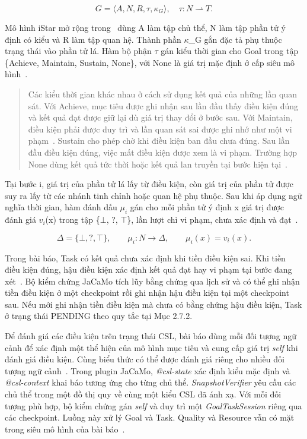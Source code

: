 \documentclass[12pt,a4paper,oneside]{extreport}
\newcommand{\thesisdisplaytitle}[2]{%
  \par\smallskip\noindent\makebox[\linewidth][c]{\small\textbf{#1}\ #2}\par\nobreak}
\begin{document}
\begin{samepage}

\thesisdisplaytitle{Định nghĩa 2.2}{Mô hình iStar mở rộng}

\[G = \langle A,N,R,\tau,\kappa_{G}\rangle,\quad\tau:N \rightharpoonup T.\]

\end{samepage}

Mô hình iStar mở rộng trong~\cite{ref-28} dùng A làm tập chủ thể, N làm tập phần tử ý định có kiểu và R làm tập quan hệ. Thành phần \(\kappa\)\_G gắn đặc tả phụ thuộc trạng thái vào phần tử lá. Hàm bộ phận \(\tau\) gán kiểu thời gian cho Goal trong tập \{Achieve, Maintain, Sustain, None\}, với None là giá trị mặc định ở cấp siêu mô hình~\cite{ref-28}.

\begin{quote}
Các kiểu thời gian khác nhau ở cách sử dụng kết quả của những lần quan sát. Với Achieve, mục tiêu được ghi nhận sau lần đầu thấy điều kiện đúng và kết quả đạt được giữ lại dù giá trị thay đổi ở bước sau. Với Maintain, điều kiện phải được duy trì và lần quan sát sai được ghi nhớ như một vi phạm~\cite{ref-28}. Sustain cho phép chờ khi điều kiện ban đầu chưa đúng. Sau lần đầu điều kiện đúng, việc mất điều kiện được xem là vi phạm. Trường hợp None dùng kết quả tức thời hoặc kết quả lan truyền tại bước hiện tại~\cite{ref-28}.
\end{quote}

Tại bước i, giá trị của phần tử lá lấy từ điều kiện, còn giá trị của phần tử được suy ra lấy từ các nhánh tinh chỉnh hoặc quan hệ phụ thuộc. Sau khi áp dụng ngữ nghĩa thời gian, hàm đánh dấu \(\mu_{i}\) gán cho mỗi phần tử ý định x giá trị được đánh giá \(v_{i}\)(x) trong tập \{\(\bot\), ?, \(\top\)\}, lần lượt chỉ vi phạm, chưa xác định và đạt~\cite{ref-28}.

\[\Delta = \{\bot,?,\top\},\quad\quad\mu_{i}:N \rightarrow \Delta,\quad\quad\mu_{i}(x) = v_{i}(x).\]

Trong bài báo, Task có kết quả chưa xác định khi tiền điều kiện sai. Khi tiền điều kiện đúng, hậu điều kiện xác định kết quả đạt hay vi phạm tại bước đang xét~\cite{ref-28}. Bộ kiểm chứng JaCaMo tích lũy bằng chứng qua lịch sử và có thể ghi nhận tiền điều kiện ở một checkpoint rồi ghi nhận hậu điều kiện tại một checkpoint sau. Nếu mới ghi nhận tiền điều kiện mà chưa có bằng chứng hậu điều kiện, Task ở trạng thái PENDING theo quy tắc tại Mục 2.7.2.

Để đánh giá các điều kiện trên trạng thái CSL, bài báo dùng mỗi đối tượng ngữ cảnh để xác định một thể hiện của mô hình mục tiêu và cung cấp giá trị \textit{self} khi đánh giá điều kiện. Cùng biểu thức có thể được đánh giá riêng cho nhiều đối tượng ngữ cảnh~\cite{ref-28}. Trong plugin JaCaMo, \textit{@csl-state} xác định kiểu mặc định và \textit{@csl-context} khai báo tương ứng cho từng chủ thể. \textit{SnapshotVerifier} yêu cầu các chủ thể trong một đồ thị quy về cùng một kiểu CSL đã ánh xạ. Với mỗi đối tượng phù hợp, bộ kiểm chứng gán \textit{self} và duy trì một \textit{GoalTaskSession} riêng qua các checkpoint. Luồng này xử lý Goal và Task. Quality và Resource vẫn có mặt trong siêu mô hình của bài báo~\cite{ref-28}.
\end{document}
